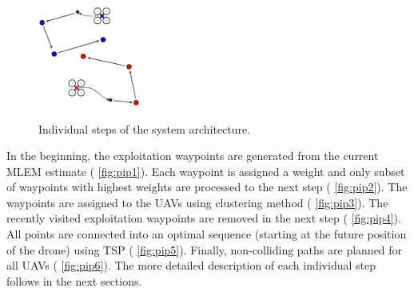 \begin{figure}[!htb]
{    \includegraphics[width=0.3\textwidth]{./fig/photos/pip5.eps}
    \label{fig:pip5}
  }
  \caption{Individual steps of the system architecture.}
  \label{fig:pipeline}
\end{figure}%

In the beginning, the exploitation waypoints are generated from the current \ac{MLEM} estimate ( \autoref{fig:pip1}).
Each waypoint is assigned a weight and only subset of waypoints with highest weights are processed to the next step ( \autoref{fig:pip2}).
The waypoints are assigned to the \ac{UAV}s using clustering method ( \autoref{fig:pip3}).
The recently visited exploitation waypoints are removed in the next step ( \autoref{fig:pip4}).
All points are connected into an optimal sequence (starting at the future position of the drone) using TSP ( \autoref{fig:pip5}).
Finally, non-colliding paths are planned for all \ac{UAV}s ( \autoref{fig:pip6}).
The more detailed description of each individual step follows in the next sections.


